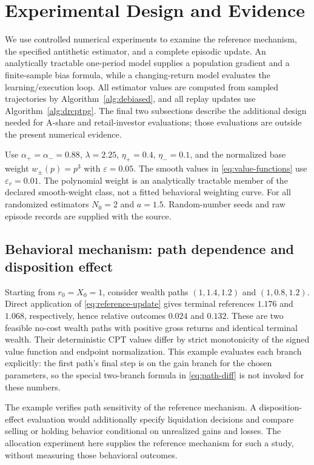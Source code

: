 \documentclass[11pt]{article}
\newcommand{\1}{\mathbf 1}
\newcommand{\eps}{\varepsilon}
\begin{document}
\section{Experimental Design and Evidence}\label{sec:experiments}
We use controlled numerical experiments to examine the reference mechanism, the specified antithetic estimator, and a complete episodic update. An analytically tractable one-period model supplies a population gradient and a finite-sample bias formula, while a changing-return model evaluates the learning/execution loop. All estimator values are computed from sampled trajectories by Algorithm~\ref{alg:debiased}, and all replay updates use Algorithm~\ref{alg:drcptpg}. The final two subsections describe the additional design needed for A-share and retail-investor evaluations; those evaluations are outside the present numerical evidence.

Use $\alpha_+=\alpha_-=0.88$, $\lambda=2.25$, $\eta_+=0.4$, $\eta_-=0.1$, and the normalized base weight $w_\pm(p)=p^3$ with $\eps=0.05$. The smooth values in \eqref{eq:value-functions} use $\eps_v=0.01$. The polynomial weight is an analytically tractable member of the declared smooth-weight class, not a fitted behavioral weighting curve. For all randomized estimators $N_0=2$ and $a=1.5$. Random-number seeds and raw episode records are supplied with the source.

\subsection{Behavioral mechanism: path dependence and disposition effect}
Starting from $r_0=X_0=1$, consider wealth paths $(1,1.4,1.2)$ and $(1,0.8,1.2)$. Direct application of \eqref{eq:reference-update} gives terminal references $1.176$ and $1.068$, respectively, hence relative outcomes $0.024$ and $0.132$. These are two feasible no-cost wealth paths with positive gross returns and identical terminal wealth. Their deterministic CPT values differ by strict monotonicity of the signed value function and endpoint normalization. This example evaluates each branch explicitly: the first path's final step is on the gain branch for the chosen parameters, so the special two-branch formula in \eqref{eq:path-diff} is not invoked for these numbers.

The example verifies path sensitivity of the reference mechanism. A disposition-effect evaluation would additionally specify liquidation decisions and compare selling or holding behavior conditional on unrealized gains and losses. The allocation experiment here supplies the reference mechanism for such a study, without measuring those behavioral outcomes.
\end{document}
